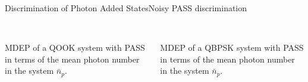 \begin{frame}{Discrimination of Photon Added States}{Noisy PASS discrimination}
    \begin{columns}
        \begin{column}{0.5\linewidth}%
            \begin{center}
                \resizebox{1\textwidth}{!}{
                    
                }\\
                \scriptsize{
                MDEP of a QOOK system with PASS in terms of the mean photon number in the system $\bar{n}_p$.\\
                }
            \end{center}
        \end{column}
        
        \begin{column}{0.5\linewidth}%
            \begin{center}
                \resizebox{1\textwidth}{!}{
                    
                }\\
                \scriptsize{
                MDEP of a QBPSK system with PASS in terms of the mean photon number in the system $\bar{n}_p$.\\
                }
            \end{center}
        \end{column}
    \end{columns}
 \mbox{} \\ \mbox{} \\
\end{frame}  
